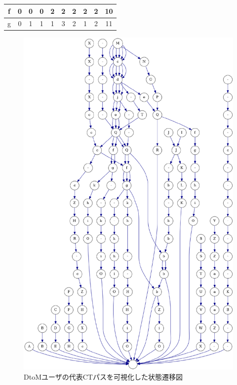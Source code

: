 \documentclass[11pt,dvipdfmx]{jreport}
\begin{document}
\begin{table}[h]
\begin{minipage}[t]{0.55\linewidth}
\begin{tabular}{c|c|cccccccc}
f                   & 0                                           & \multicolumn{1}{c|}{0} & \multicolumn{1}{c|}{0} & \multicolumn{1}{c|}{2} & \multicolumn{1}{c|}{2} & \multicolumn{1}{c|}{2} & \multicolumn{1}{c|}{2} & \multicolumn{1}{c|}{2} & 10  \\ \hline
g                   & 0                                           & \multicolumn{1}{c|}{1} & \multicolumn{1}{c|}{1} & \multicolumn{1}{c|}{1} & \multicolumn{1}{c|}{3} & \multicolumn{1}{c|}{2} & \multicolumn{1}{c|}{1} & \multicolumn{1}{c|}{2} & 11 \\ \hline
\end{tabular}
  \end{minipage}
\end{table}

\begin{figure}[t]
	\centering
	\includegraphics[width=0.8\linewidth]{Okamoto_fig/digraph-dtom.pdf}
        \vspace{-5mm}
	\caption{DtoMユーザの代表CTパスを可視化した状態遷移図}
	\label{fig:digraph-dtom}
\end{figure}
\end{document}
